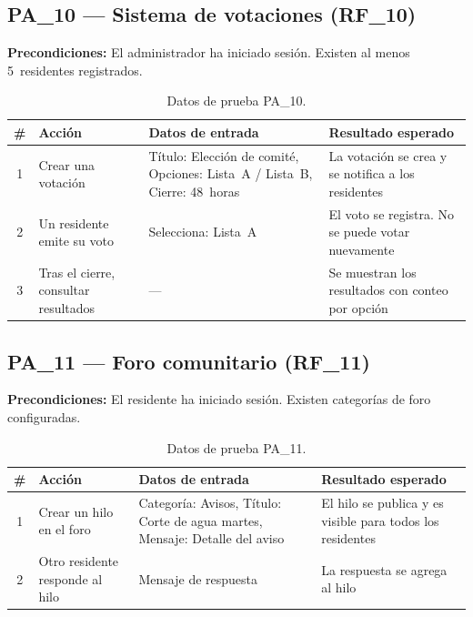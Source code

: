 \subsection{PA\_10 — Sistema de votaciones (RF\_10)}

\textbf{Precondiciones:} El administrador ha iniciado sesión. Existen al menos 5~residentes registrados.

\begin{table}[H]
\centering
\small
\begin{tabular}{|c|p{}|p{}|p{}|}
\hline
\textbf{\#} & \textbf{Acción} & \textbf{Datos de entrada} & \textbf{Resultado esperado} \\ \hline
1 & Crear una votación & Título: Elección de comité, Opciones: Lista~A / Lista~B, Cierre: 48~horas & La votación se crea y se notifica a los residentes \\ \hline
2 & Un residente emite su voto & Selecciona: Lista~A & El voto se registra. No se puede votar nuevamente \\ \hline
3 & Tras el cierre, consultar resultados & --- & Se muestran los resultados con conteo por opción \\ \hline
\end{tabular}
\caption{Datos de prueba PA\_10.}
\end{table}

\subsection{PA\_11 — Foro comunitario (RF\_11)}

\textbf{Precondiciones:} El residente ha iniciado sesión. Existen categorías de foro configuradas.

\begin{table}[H]
\centering
\small
\begin{tabular}{|c|p{}|p{}|p{}|}
\hline
\textbf{\#} & \textbf{Acción} & \textbf{Datos de entrada} & \textbf{Resultado esperado} \\ \hline
1 & Crear un hilo en el foro & Categoría: Avisos, Título: Corte de agua martes, Mensaje: Detalle del aviso & El hilo se publica y es visible para todos los residentes \\ \hline
2 & Otro residente responde al hilo & Mensaje de respuesta & La respuesta se agrega al hilo \\ \hline
\end{tabular}
\caption{Datos de prueba PA\_11.}
\end{table}

